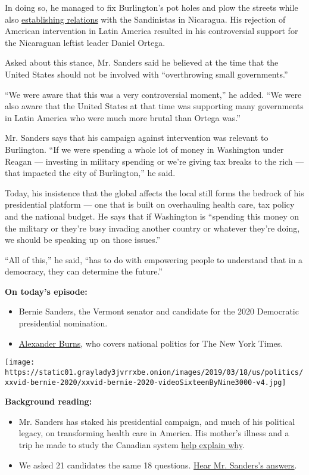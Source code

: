 In doing so, he managed to fix Burlington's pot holes and plow the
streets while also
\href{https://www.nytimes3xbfgragh.onion/2007/01/21/magazine/21Sanders.t.html}{establishing
relations} with the Sandinistas in Nicaragua. His rejection of American
intervention in Latin America resulted in his controversial support for
the Nicaraguan leftist leader Daniel Ortega.

Asked about this stance, Mr. Sanders said he believed at the time that
the United States should not be involved with ``overthrowing small
governments.''

``We were aware that this was a very controversial moment,'' he added.
``We were also aware that the United States at that time was supporting
many governments in Latin America who were much more brutal than Ortega
was.''

Mr. Sanders says that his campaign against intervention was relevant to
Burlington. ``If we were spending a whole lot of money in Washington
under Reagan --- investing in military spending or we're giving tax
breaks to the rich --- that impacted the city of Burlington,'' he said.

Today, his insistence that the global affects the local still forms the
bedrock of his presidential platform --- one that is built on
overhauling health care, tax policy and the national budget. He says
that if Washington is ``spending this money on the military or they're
busy invading another country or whatever they're doing, we should be
speaking up on those issues.''

``All of this,'' he said, ``has to do with empowering people to
understand that in a democracy, they can determine the future.''

\textbf{On today's episode:}

\begin{itemize}
\item
  Bernie Sanders, the Vermont senator and candidate for the 2020
  Democratic presidential nomination.
\item
  \href{https://www.nytimes3xbfgragh.onion/by/alexander-burns}{Alexander
  Burns}, who covers national politics for The New York Times.
\end{itemize}

\texttt{[image: https://static01.graylady3jvrrxbe.onion/images/2019/03/18/us/politics/xxvid-bernie-2020/xxvid-bernie-2020-videoSixteenByNine3000-v4.jpg]}

\textbf{Background reading:}

\begin{itemize}
\item
  Mr. Sanders has staked his presidential campaign, and much of his
  political legacy, on transforming health care in America. His mother's
  illness and a trip he made to study the Canadian system
  \href{https://www.nytimes3xbfgragh.onion/2019/09/09/us/politics/bernie-sanders-health-care.html}{help
  explain why}.
\item
  We asked 21 candidates the same 18 questions.
  \href{https://www.nytimes3xbfgragh.onion/interactive/2019/us/politics/bernie-sanders-2020-campaign.html}{Hear
  Mr. Sanders's answers}.
\end{itemize}

